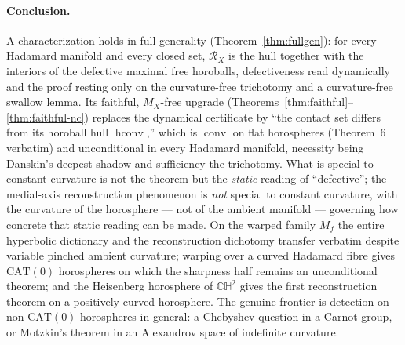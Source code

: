 \documentclass[11pt]{article}
\theoremstyle{remark}
\newcommand{\X}{X}
\newcommand{\Mx}{M_{\X}}
\newcommand{\Rx}{\mathcal{R}_{\X}}
\newcommand{\conv}{\operatorname{conv}}
\newcommand{\hconv}{\operatorname{hconv}}
\newcommand{\Mf}{M_{f}}
\begin{document}
\paragraph{Conclusion.} A characterization holds in full generality
(Theorem~\ref{thm:fullgen}): for every Hadamard manifold and every
closed set, $\Rx$ is the hull together with the interiors of the
defective maximal free horoballs, defectiveness read dynamically and
the proof resting only on the curvature-free trichotomy and a
curvature-free swallow lemma. Its faithful, $\Mx$-free upgrade
(Theorems~\ref{thm:faithful}--\ref{thm:faithful-nc}) replaces the
dynamical certificate by ``the contact set differs from its horoball
hull $\hconv$,'' which is $\conv$ on flat horospheres (Theorem~6
verbatim) and unconditional in every Hadamard manifold, necessity being
Danskin's deepest-shadow and sufficiency the trichotomy. What is
special to constant curvature is not the theorem but the \emph{static}
reading of ``defective''; the medial-axis reconstruction phenomenon is
\emph{not} special to constant curvature, with the curvature of the
horosphere --- not of the ambient manifold --- governing how concrete
that static reading can be made. On the warped family $\Mf$ the entire
hyperbolic dictionary and the reconstruction dichotomy transfer
verbatim despite variable pinched ambient curvature; warping over a
curved Hadamard fibre gives $\mathrm{CAT}(0)$ horospheres on which the
sharpness half remains an unconditional theorem; and the Heisenberg
horosphere of $\mathbb{CH}^{2}$ gives the first reconstruction theorem
on a positively curved horosphere. The genuine frontier is detection on
non-$\mathrm{CAT}(0)$ horospheres in general: a Chebyshev question in a
Carnot group, or Motzkin's theorem in an Alexandrov space of indefinite
curvature.
\end{document}
